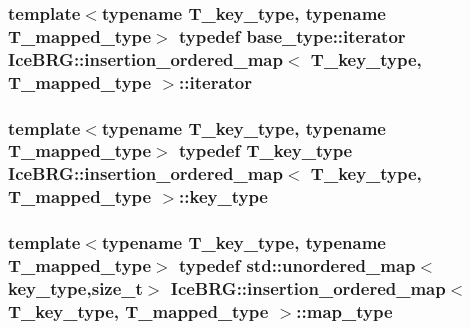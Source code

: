\subsubsection[{iterator}]{\setlength{\rightskip}{0pt plus 5cm}template$<$typename T\+\_\+key\+\_\+type, typename T\+\_\+mapped\+\_\+type$>$ typedef base\+\_\+type\+::iterator {\bf Ice\+B\+R\+G\+::insertion\+\_\+ordered\+\_\+map}$<$ T\+\_\+key\+\_\+type, T\+\_\+mapped\+\_\+type $>$\+::{\bf iterator}}\label{classIceBRG_1_1insertion__ordered__map_ac41b1e73bdb41c7b45da36e8eca7fb70}
\hypertarget{classIceBRG_1_1insertion__ordered__map_a89f1c1aa5a0c6d1a681a0957092bb738}{}
\subsubsection[{key\+\_\+type}]{\setlength{\rightskip}{0pt plus 5cm}template$<$typename T\+\_\+key\+\_\+type, typename T\+\_\+mapped\+\_\+type$>$ typedef T\+\_\+key\+\_\+type {\bf Ice\+B\+R\+G\+::insertion\+\_\+ordered\+\_\+map}$<$ T\+\_\+key\+\_\+type, T\+\_\+mapped\+\_\+type $>$\+::{\bf key\+\_\+type}}\label{classIceBRG_1_1insertion__ordered__map_a89f1c1aa5a0c6d1a681a0957092bb738}
\hypertarget{classIceBRG_1_1insertion__ordered__map_a934f40368284ca35feac3413f95fe4a9}{}
\subsubsection[{map\+\_\+type}]{\setlength{\rightskip}{0pt plus 5cm}template$<$typename T\+\_\+key\+\_\+type, typename T\+\_\+mapped\+\_\+type$>$ typedef std\+::unordered\+\_\+map$<${\bf key\+\_\+type},size\+\_\+t$>$ {\bf Ice\+B\+R\+G\+::insertion\+\_\+ordered\+\_\+map}$<$ T\+\_\+key\+\_\+type, T\+\_\+mapped\+\_\+type $>$\+::{\bf map\+\_\+type}}\label{classIceBRG_1_1insertion__ordered__map_a934f40368284ca35feac3413f95fe4a9}
\hypertarget{classIceBRG_1_1insertion__ordered__map_a4ab99f9f37138d3239735b5ff4aac2e5}{}
